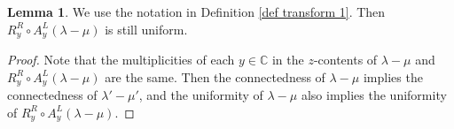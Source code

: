 \documentclass[11pt]{amsart}
\numberwithin{equation}{section}
\theoremstyle{definition}
\newtheorem{lemma}[thm]{Lemma}
\newtheorem{definition}[thm]{Definition}
\begin{document}





\begin{lemma} \label{lem conn uniform transform}
We use the notation in Definition \ref{def transform 1}. Then $ R^R_y \circ A^L_y(\lambda-\mu)$ is still uniform.
\end{lemma}

\begin{proof}
Note that the multiplicities of each $y \in \mathbb C$ in the $z$-contents of $\lambda-\mu$ and $R^R_y\circ A^L_y(\lambda-\mu)$ are the same. Then the connectedness of $\lambda-\mu$ implies the connectedness of $\lambda'-\mu'$, and the uniformity of $\lambda-\mu$ also implies the uniformity of $R^R_y\circ A^L_y(\lambda-\mu)$.
\end{proof}
\end{document}
